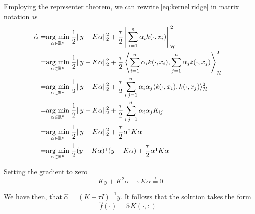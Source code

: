 Employing the representer theorem, we can rewrite \ref{eq:kernel ridge} in matrix notation as
\begin{equation}
    \begin{aligned}
    \hat{\alpha}=&\underset{\alpha \in \mathbb{R}^n}{\operatorname{arg}\,\operatorname{min}}\;\frac{1}{2}\|y-K\alpha\|_2^2+\frac{\tau}{2}\left\|\sum _{i=1}^{n}\alpha _{i}k(\cdot ,x_{i})\right\|_{\mathcal{H}}^2
    \\
    =&\underset{\alpha \in \mathbb{R}^n}{\operatorname{arg}\,\operatorname{min}}\;\frac{1}{2}\|y-K\alpha\|_2^2+\frac{\tau}{2} \left\langle \sum _{i=1}^{n}\alpha _{i}k(\cdot ,x_{i}),\sum _{j=1}^{n}\alpha _{j}k(\cdot ,x_{j})\right\rangle_{\mathcal{H}}^2
    \\
    =&\underset{\alpha \in \mathbb{R}^n}{\operatorname{arg}\,\operatorname{min}}\;\frac{1}{2}\|y-K\alpha\|_2^2+\frac{\tau}{2} \sum _{i,j=1}^{n}\alpha _{i}\alpha _{j}\langle k(\cdot ,x_{i}),k(\cdot ,x_{j})\rangle_{\mathcal{H}}^2
    \\
    =&\underset{\alpha \in \mathbb{R}^n}{\operatorname{arg}\,\operatorname{min}}\;\frac{1}{2}\|y-K\alpha\|_2^2+\frac{\tau}{2} \sum _{i,j=1}^{n}\alpha _{i}\alpha _{j}K_{ij}
    \\
    =&\underset{\alpha \in \mathbb{R}^n}{\operatorname{arg}\,\operatorname{min}}\;\frac{1}{2}\|y-K\alpha\|_2^2+\frac{\tau}{2} \alpha^\intercal K \alpha
    \\
    =&\underset{\alpha \in \mathbb{R}^n}{\operatorname{arg}\,\operatorname{min}}\;\frac{1}{2}(y-K\alpha)^\intercal (y-K\alpha)+\frac{\tau}{2} \alpha^\intercal K \alpha
\end{aligned}
\end{equation}

Setting the gradient to zero
\begin{equation}
    -Ky+K^2\alpha+\tau K \alpha\overset{!}{=}0
\end{equation}

We have then, that $\hat{\alpha}=(K+\tau I)^{-1}y$. It follows that the solution takes the form
\begin{equation}
    \hat{f}(\cdot)=\hat{\alpha}K(\cdot,:)
\end{equation}

